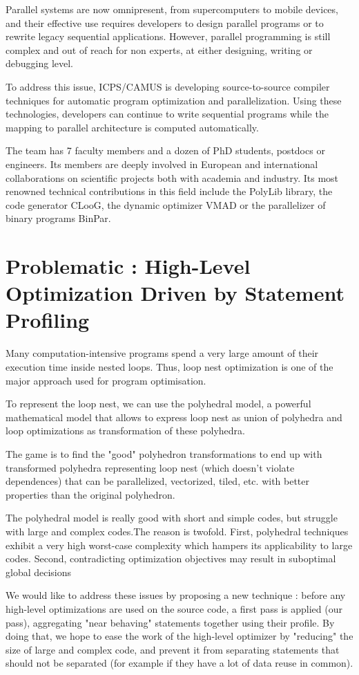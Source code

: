 \documentclass[paper=a4, fontsize=11.5pt]{scrartcl}
\numberwithin{equation}{section}        %
\numberwithin{figure}{section}          %
\numberwithin{table}{section}               %
\begin{document}
Parallel systems are now omnipresent, from supercomputers to mobile devices,
and their effective use requires developers to design parallel programs or to rewrite
legacy sequential applications. However, parallel programming is still complex and out
of reach for non experts, at either designing, writing or debugging level.

To address this issue, ICPS/CAMUS is developing source-to-source compiler techniques
for automatic program optimization and parallelization. Using these technologies,
developers can continue to write sequential programs while the mapping to parallel
architecture is computed automatically.

The team has 7 faculty members and a dozen of PhD students,
postdocs or engineers. Its members are deeply involved in European and international
collaborations on scientific projects both with academia and industry.
Its most renowned technical contributions in this field include
the PolyLib library, the code generator CLooG, the dynamic optimizer VMAD or the parallelizer
of binary programs BinPar.


\section{Problematic : High-Level Optimization Driven by Statement Profiling}
Many computation-intensive programs spend a very large amount of their execution
time inside nested loops. Thus, loop nest optimization is one of the major approach used
for program optimisation.

To represent the loop nest, we can use the polyhedral model, a powerful mathematical model
that allows to express loop nest as union of polyhedra and loop optimizations as
transformation of these polyhedra.

The game is to find the "good" polyhedron transformations to end up with
transformed polyhedra representing loop nest (which doesn't violate dependences) 
that can be parallelized, vectorized, tiled, etc. with better properties than the original
polyhedron.

The polyhedral model is really good with short and simple codes, but struggle with
large and complex codes.The reason is twofold. First, polyhedral techniques exhibit
a very high worst-case complexity which hampers its applicability to large codes.
Second, contradicting optimization objectives may result in suboptimal global
decisions


We would like to address these issues by proposing a new technique : before any
high-level optimizations are used on the source code, a first pass is applied (our pass),
aggregating "near behaving" statements together using their profile.
By doing that, we hope to ease the work of the high-level optimizer by "reducing" the size
of large and complex code, and prevent it from separating statements that should
not be separated (for example if they have a lot of data reuse in common).
\end{document}
